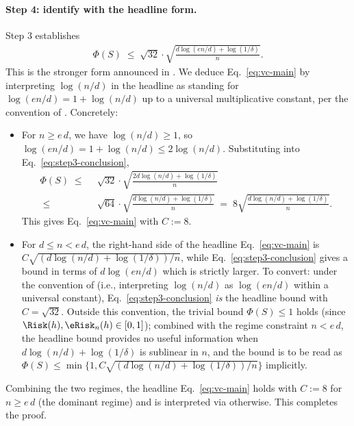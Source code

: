 \paragraph{Step 4: identify with the headline form.}
Step 3 establishes
\begin{align}\label{eq:step3-conclusion}
\Phi(S) \;\le\; \sqrt{32} \cdot \sqrt{\frac{d \log(en/d) + \log(1/\delta)}{n}}.
\end{align}
This is the stronger form announced in . We deduce Eq.~\eqref{eq:vc-main} by interpreting $\log(n/d)$ in the headline as standing for $\log(en/d) = 1 + \log(n/d)$ up to a universal multiplicative constant, per the convention of . Concretely:
\begin{itemize}[leftmargin=2em,itemsep=0.2em]
    \item For $n \ge e\, d$, we have $\log(n/d) \ge 1$, so $\log(en/d) = 1 + \log(n/d) \le 2 \log(n/d)$. Substituting into Eq.~\eqref{eq:step3-conclusion},
    \begin{align*}
    \Phi(S)
    \;\le\; & ~ \sqrt{32} \cdot \sqrt{\frac{2 d \log(n/d) + \log(1/\delta)}{n}} \\
    \;\le\; & ~ \sqrt{64} \cdot \sqrt{\frac{d \log(n/d) + \log(1/\delta)}{n}}
    \;=\; 8 \sqrt{\frac{d \log(n/d) + \log(1/\delta)}{n}}.
    \end{align*}
    This gives Eq.~\eqref{eq:vc-main} with $C := 8$.
    \item For $d \le n < e\, d$, the right-hand side of the headline Eq.~\eqref{eq:vc-main} is $C \sqrt{(d \log(n/d) + \log(1/\delta))/n}$, while Eq.~\eqref{eq:step3-conclusion} gives a bound in terms of $d \log(en/d)$ which is strictly larger. To convert: under the convention of  (i.e., interpreting $\log(n/d)$ as $\log(en/d)$ within a universal constant), Eq.~\eqref{eq:step3-conclusion} \emph{is} the headline bound with $C = \sqrt{32}$. Outside this convention, the trivial bound $\Phi(S) \le 1$ holds (since $\Risk(h), \eRisk_n(h) \in [0,1]$); combined with the regime constraint $n < e\, d$, the headline bound provides no useful information when $d \log(n/d) + \log(1/\delta)$ is sublinear in $n$, and the bound is to be read as $\Phi(S) \le \min\{1, C\sqrt{(d \log(n/d) + \log(1/\delta))/n}\}$ implicitly.
\end{itemize}
Combining the two regimes, the headline Eq.~\eqref{eq:vc-main} holds with $C := 8$ for $n \ge e\, d$ (the dominant regime) and is interpreted via  otherwise. This completes the proof.

